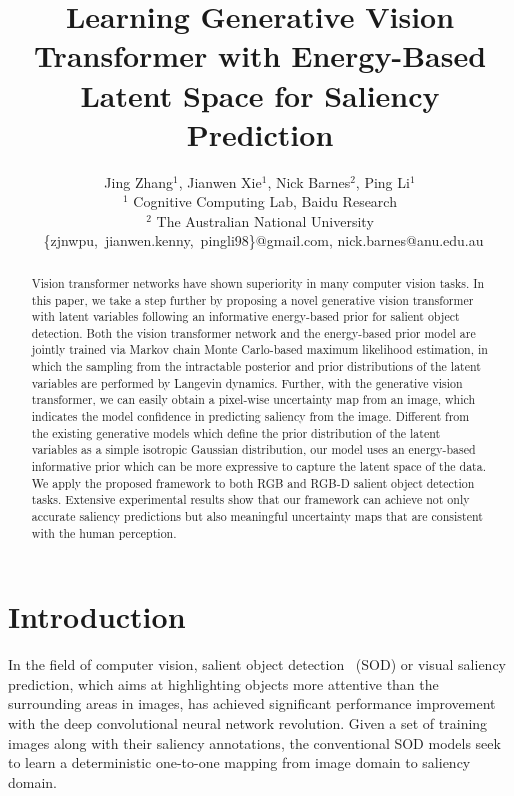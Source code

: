 \documentclass{article}
\title{
Learning Generative Vision Transformer with Energy-Based Latent Space for Saliency Prediction
}
\author{Jing Zhang$^{1}$,
  Jianwen Xie$^{1}$,
  Nick Barnes$^{2}$,
  Ping Li$^{1}$\\
$^{1}$ Cognitive Computing Lab, 
Baidu Research\\ $^{2}$ The Australian National University \\
\ \{zjnwpu,\ jianwen.kenny,\ pingli98\}@gmail.com,  nick.barnes@anu.edu.au 
}
\begin{document}
\maketitle

\begin{abstract}
Vision transformer networks have shown superiority in many computer vision tasks. In this paper, we take a step further by proposing a novel generative vision transformer with latent variables following an informative energy-based prior for salient object detection. Both the vision transformer network and the energy-based prior model are jointly trained via Markov chain Monte Carlo-based maximum likelihood estimation, in which the sampling from the intractable posterior and prior distributions of the latent variables are performed by Langevin dynamics. Further, with the generative vision transformer, we can easily obtain a pixel-wise uncertainty map from an image, which indicates the model confidence in predicting saliency from the image. Different from the existing generative models which define the prior distribution of the latent variables as a simple isotropic Gaussian distribution, our model uses an energy-based informative prior which can be more expressive to capture the latent space of the data. We apply the proposed framework to both RGB and RGB-D salient object detection tasks.
Extensive experimental results show that our framework can achieve not only accurate saliency predictions but also meaningful uncertainty maps that are consistent with the human perception. 
\end{abstract}

\section{Introduction}\label{intro_sec}

In the field of computer vision, salient object detection~\cite{wei2020f3net,wei2020label,fan2020bbs,Fu2020JLDCF,chen2018progressively,jing2020weakly} (SOD) or visual saliency prediction, which aims at highlighting objects more attentive than the surrounding areas in images, has achieved significant performance improvement with the deep convolutional neural network revolution.
Given a set of training images along with their saliency annotations, the conventional SOD models seek to learn a deterministic one-to-one mapping from image domain to saliency domain.
\end{document}
